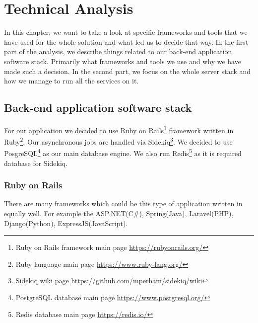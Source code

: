 
\chapter{Technical Analysis}
In this chapter, we want to take a look at specific frameworks and tools that we have used for the whole solution and what led us to decide that way. In the first part of the analysis, we describe things related to our back-end application software stack. Primarily what frameworks and tools we use and why we have made such a decision. In the second part, we focus on the whole server stack and how we manage to run all the services on it. 

\section{Back-end application software stack}
For our application we decided to use Ruby on Rails\footnote{ Ruby on Rails framework main page \url{https://rubyonrails.org/}} framework written in Ruby\footnote{ Ruby language main page \url{https://www.ruby-lang.org/}}. 
Our asynchronous jobs are handled via Sidekiq\footnote{ Sidekiq wiki page \url{https://github.com/mperham/sidekiq/wiki}}. We decided to use PosgreSQL\footnote{ PostgreSQL database main page \url{https://www.postgresql.org/}} as our main database engine. We also run Redis\footnote{ Redis database main page \url{https://redis.io/}} as it is required database for Sidekiq.
\subsection{Ruby on Rails}
There are many frameworks which could be this type of application written in equally well. For example the ASP.NET(C\#), Spring(Java), Laravel(PHP), Django(Python), ExpressJS(JavaScript).


